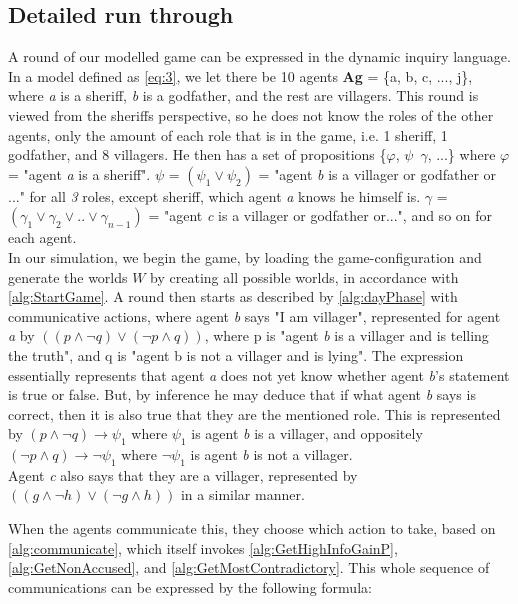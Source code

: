 \subsection{Detailed run through}\label{sec:ARoundOfTheGame}
A round of our modelled game can be expressed in the dynamic inquiry language.
In a model defined as \cref{eq:3}, we let there be 10 agents \textbf{Ag} = \{a,
b, c, ..., j\}, where \textit{a} is a sheriff, \textit{b} is a godfather, and
the rest are villagers. This round is viewed from the sheriffs perspective, so
he does not know the roles of the other agents, only the amount of each role
that is in the game, i.e. 1 sheriff, 1 godfather, and 8 villagers. He then has
a set of propositions \{$\varphi$, $\psi$\, $\gamma$, ...\} where $\varphi$ =
"agent \textit{a} is a sheriff". $\psi$ = $(\psi_1 \lor \psi_2)$ = "agent
\textit{b} is a villager or godfather or ..." for all \textit{3} roles, except
sheriff, which agent \textit{a} knows he himself is. $\gamma$ = $(\gamma_1 \lor
	\gamma_2 \lor .. \lor \gamma_{n-1}) $ = "agent \textit{c} is a villager or
godfather or...", and so on for each agent. \\ In our simulation, we begin the
game, by loading the game-configuration and generate the worlds $W$ by creating
all possible worlds, in accordance with \cref{alg:StartGame}. A round then
starts as described by \cref{alg:dayPhase} with communicative actions, where
agent \textit{b} says "I am villager", represented for agent \textit{a} by $((p
	\land \neg q) \lor (\neg p \land q))$, where p is "agent \textit{b} is a
villager and is telling the truth", and q is "agent b is not a villager and is
lying". The expression essentially represents that agent \textit{a} does not
yet know whether agent \textit{b}'s statement is true or false. But, by
inference he may deduce that if what agent \textit{b} says is correct, then it
is also true that they are the mentioned role. This is represented by $(p \land
	\neg q) \rightarrow \psi_1$ where $\psi_1$ is agent \textit{b} is a villager,
and oppositely $(\neg p \land q) \rightarrow \neg \psi_1$ where $\neg \psi_1$
is agent \textit{b} is not a villager. \\ Agent \textit{c} also says that they
are a villager, represented by $((g \land \neg h) \lor (\neg g \land h))$ in a
similar manner.

When the agents communicate this, they choose which action to take, based on
\cref{alg:communicate}, which itself invokes \cref{alg:GetHighInfoGainP},
\cref{alg:GetNonAccused}, and \cref{alg:GetMostContradictory}. This whole
sequence of communications can be expressed by the following formula:

